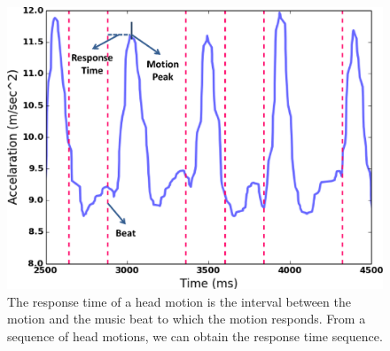 
\begin{figure}[t]
\includegraphics[width=.75\columnwidth]{figure/waveform.eps}
\centering
\caption{\label{fig:waveform}The response time of a head motion is the interval between the motion and the music beat to which the motion responds. From a sequence of head motions, we can obtain the response time sequence.}
\end{figure}


